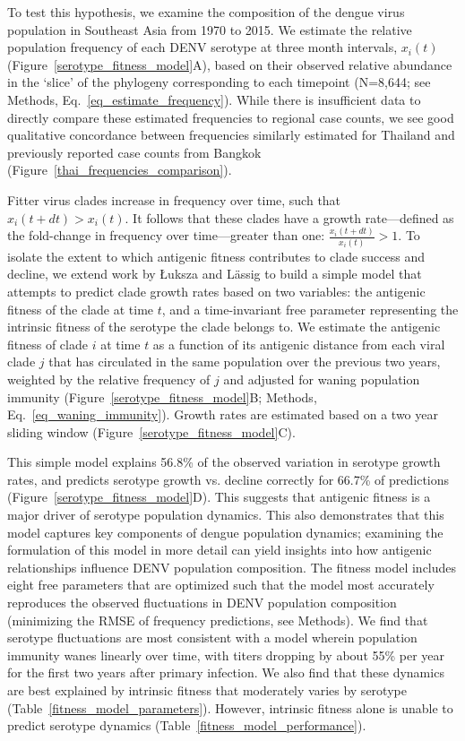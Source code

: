 \documentclass[11pt,oneside,letterpaper]{article}
\begin{document}
To test this hypothesis, we examine the composition of the dengue virus population in Southeast Asia from 1970 to 2015.
We estimate the relative population frequency of each DENV serotype at three month intervals, $x_i(t)$ (Figure~\ref{serotype_fitness_model}A), based on their observed relative abundance in the `slice' of the phylogeny corresponding to each timepoint (N=8,644; see Methods, Eq.~\ref{eq_estimate_frequency}).
While there is insufficient data to directly compare these estimated frequencies to regional case counts, we see good qualitative concordance between frequencies similarly estimated for Thailand and previously reported case counts from Bangkok (Figure~\ref{thai_frequencies_comparison}).

Fitter virus clades increase in frequency over time, such that $x_i(t+dt) > x_i(t)$.
It follows that these clades have a growth rate---defined as the fold-change in frequency over time---greater than one: $\frac{x_i(t+dt)}{x_i(t)} > 1$.
To isolate the extent to which antigenic fitness contributes to clade success and decline, we extend work by {\L}uksza and L\"assig  \citep{luksza2014predictive} to build a simple model that attempts to predict clade growth rates based on two variables: the antigenic fitness of the clade at time $t$, and a time-invariant free parameter representing the intrinsic fitness of the serotype the clade belongs to.
We estimate the antigenic fitness of clade $i$ at time $t$ as a function of its antigenic distance from each viral clade $j$ that has circulated in the same population over the previous two years, weighted by the relative frequency of $j$ and adjusted for waning population immunity (Figure~\ref{serotype_fitness_model}B; Methods, Eq.~\ref{eq_waning_immunity}).
Growth rates are estimated based on a two year sliding window (Figure~\ref{serotype_fitness_model}C).

This simple model explains 56.8\% of the observed variation in serotype growth rates, and predicts serotype growth vs. decline correctly for 66.7\% of predictions (Figure~\ref{serotype_fitness_model}D).
This suggests that antigenic fitness is a major driver of serotype population dynamics.
This also demonstrates that this model captures key components of dengue population dynamics; examining the formulation of this model in more detail can yield insights into how antigenic relationships influence DENV population composition.
The fitness model includes eight free parameters that are optimized such that the model most accurately reproduces the observed fluctuations in DENV population composition (minimizing the RMSE of frequency predictions, see Methods).
We find that serotype fluctuations are most consistent with a model wherein population immunity wanes linearly over time, with titers dropping by about 55\% per year for the first two years after primary infection.
We also find that these dynamics are best explained by intrinsic fitness that moderately varies by serotype (Table~\ref{fitness_model_parameters}).
However, intrinsic fitness alone is unable to predict serotype dynamics (Table~\ref{fitness_model_performance}).
\end{document}
